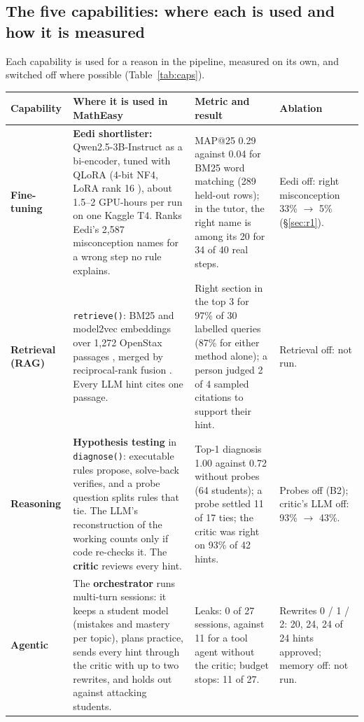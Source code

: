 \documentclass[11pt,a4paper]{article}
\renewcommand{\arraystretch}{1.15}
\newcommand{\code}[1]{\texttt{#1}}
\begin{document}
\subsection{The five capabilities: where each is used and how it is measured}\label{sec:caps}

Each capability is used for a reason in the pipeline, measured on its own, and switched off where possible (Table~\ref{tab:caps}).

\begin{table}[!htbp]
\centering\scriptsize
\renewcommand{\arraystretch}{1.25}
\begin{tabularx}{\linewidth}{@{}P{1.55cm}YP{4.6cm}P{2.6cm}@{}}
\toprule
Capability & Where it is used in MathEasy & Metric and result & Ablation \\
\midrule
\textbf{Fine-tuning} & \textbf{Eedi shortlister:} Qwen2.5-3B-Instruct \cite{qwen25} as a bi-encoder, tuned with QLoRA \cite{qlora} (4-bit NF4, LoRA rank 16 \cite{lora}), about 1.5--2 GPU-hours per run on one Kaggle T4. Ranks Eedi's 2,587 misconception names for a wrong step no rule explains. & MAP@25 0.29 against 0.04 for BM25 word matching (289 held-out rows); in the tutor, the right name is among its 20 for 34 of 40 real steps. & Eedi off: right misconception 33\% $\to$ 5\% (\S\ref{sec:r1}). \\
\textbf{Retrieval (RAG)} & \code{retrieve()}: BM25 and model2vec embeddings over 1,272 OpenStax passages \cite{openstax-pre,openstax-alg}, merged by reciprocal-rank fusion \cite{rrf}. Every LLM hint cites one passage. & Right section in the top 3 for 97\% of 30 labelled queries (87\% for either method alone); a person judged 2 of 4 sampled citations to support their hint. & Retrieval off: not run. \\
\textbf{Reasoning} & \textbf{Hypothesis testing} in \code{diagnose()}: executable rules propose, solve-back verifies, and a probe question splits rules that tie. The LLM's reconstruction of the working counts only if code re-checks it. The \textbf{critic} reviews every hint. & Top-1 diagnosis 1.00 against 0.72 without probes (64 students); a probe settled 11 of 17 ties; the critic was right on 93\% of 42 hints. & Probes off (B2); critic's LLM off: 93\% $\to$ 43\%. \\
\textbf{Agentic} & The \textbf{orchestrator} runs multi-turn sessions: it keeps a student model (mistakes and mastery per topic), plans practice, sends every hint through the critic with up to two rewrites, and holds out against attacking students. & Leaks: 0 of 27 sessions, against 11 for a tool agent without the critic; budget stops: 11 of 27. & Rewrites 0 / 1 / 2: 20, 24, 24 of 24 hints approved; memory off: not run. \\

\end{tabularx}
\end{table}
\end{document}
